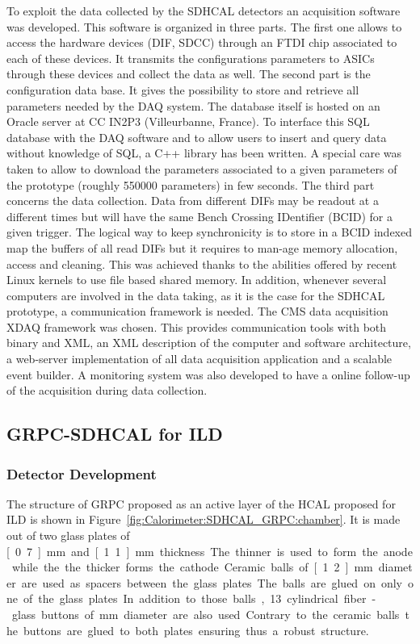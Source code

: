To exploit the data collected by the SDHCAL detectors an acquisition software
was developed. This software is organized in three parts. The first one allows
to access the hardware devices (DIF, SDCC) through an FTDI chip associated to
each of these devices. It transmits the configurations parameters to ASICs
through these devices and collect the data as well. The second part is the
configuration data base. It gives the possibility to store and retrieve all
parameters needed by the DAQ system. The database itself is hosted on an Oracle
server at CC IN2P3 (Villeurbanne, France). To interface this SQL database with
the DAQ software and to allow users to insert and query data without knowledge
of SQL, a C++ library has been written. A special care was taken to allow to
download the parameters associated to a given parameters of the prototype
(roughly 550000 parameters) in few seconds. The third part concerns the data
collection. Data from different DIFs may be readout at a different times but
will have the same Bench Crossing IDentifier (BCID) for a given trigger. The
logical way to keep synchronicity is to store in a BCID indexed map the buffers
of all read DIFs but it requires to man-age memory allocation, access and
cleaning. This was achieved thanks to the abilities offered by recent Linux
kernels to use file based shared memory. In addition, whenever several
computers are involved in the data taking, as it is the case for the SDHCAL
prototype, a communication framework is needed. The CMS data acquisition XDAQ
framework was chosen. This provides communication tools with both binary and
XML, an XML description of the computer and software architecture, a web-server
implementation of all data acquisition application and a scalable event builder.
A monitoring system was also developed to have a online follow-up of the
acquisition during data collection.

\subsection{GRPC-SDHCAL for ILD}
\subsubsection{Detector Development}

The structure
of GRPC proposed as an active layer of the HCAL proposed for ILD is shown in
Figure~\ref{fig:Calorimeter:SDHCAL_GRPC:chamber}. It is made out of two glass plates of \unit[0.7]{mm} and \unit[1.1]{mm}
thickness. The thinner is used to form the anode while the the thicker forms
the cathode. Ceramic balls of \unit[1.2]{mm} diameter are used as spacers between the
glass plates. The balls are glued on only one of the glass plates. In
addition to those balls, 13 cylindrical fiber-glass buttons of \unit[4]{mm} diameter
are also used. Contrary to the ceramic balls the buttons are glued to both
plates ensuring thus a robust structure.

